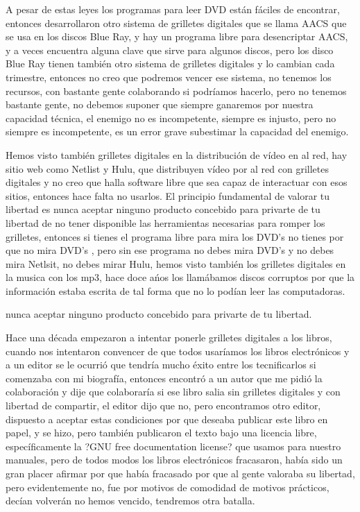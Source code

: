 \begin{multicols}{2}
A pesar de estas leyes los programas para leer DVD están fáciles de encontrar, entonces desarrollaron otro sistema de grilletes digitales que se llama AACS que se usa en los discos Blue Ray, y hay un programa libre para desencriptar AACS, y a veces encuentra alguna clave que sirve para algunos discos, pero los disco Blue Ray tienen también otro sistema de grilletes digitales y lo cambian cada trimestre, entonces no creo que podremos vencer ese sistema, no tenemos los recursos, con bastante gente colaborando si podríamos hacerlo, pero no tenemos bastante gente, no debemos suponer que siempre ganaremos por nuestra capacidad técnica, el enemigo no es incompetente, siempre es injusto, pero no siempre es incompetente, es un error grave subestimar la capacidad del enemigo.

Hemos visto también grilletes digitales en la distribución de vídeo en al red, hay sitio web como Netlist y Hulu, que distribuyen vídeo por al red con grilletes digitales y no creo que halla software libre que sea capaz de interactuar con esos sitios, entonces hace falta no usarlos. El principio fundamental de valorar tu libertad es nunca aceptar ninguno producto concebido para privarte de tu libertad de no tener disponible las herramientas necesarias para romper los grilletes, entonces si tienes el programa libre para mira los DVD's no tienes por que no mira DVD's , pero sin ese programa no debes mira DVD's  y no debes mira Netlsit, no debes mirar Hulu, hemos visto también los grilletes digitales en la musica con los mp3, hace doce ańos los llamábamos discos corruptos por que la información estaba escrita de tal forma que no lo podían leer las computadoras. 


\begin{entradilla} %
{\em {\color{introcolor}{ nunca }}}nunca aceptar ninguno producto concebido para privarte de tu libertad.
\end{entradilla}


Hace una década empezaron a intentar ponerle grilletes digitales a los libros, cuando nos intentaron convencer de que todos usaríamos los libros electrónicos y a un editor se le ocurrió que tendría mucho éxito entre los tecnificarlos si comenzaba con mi biografía, entonces encontró a un autor que me pidió la colaboración y dije que colaboraría si ese libro salia sin grilletes digitales y con libertad de compartir, el editor dijo que no, pero encontramos otro editor, dispuesto a aceptar estas condiciones por que deseaba publicar este libro en papel, y se hizo, pero también publicaron el texto bajo una licencia libre, específicamente la ?GNU free documentation license? que usamos para nuestro manuales, pero de todos modos los libros electrónicos fracasaron, había sido un gran placer afirmar por que había fracasado por que al gente valoraba su libertad, pero evidentemente no, fue por motivos de comodidad de motivos prácticos, decían volverán no hemos vencido, tendremos otra batalla.


\end{multicols}
